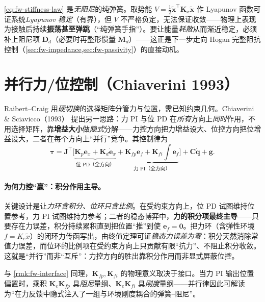 \begin{insight}
\label{ins:fw-stiffness-bounce}
\cref{eq:fw-stiffness-law} 是\emph{无阻尼}的纯弹簧。取势能 $V=\tfrac12\tilde{\mathbf{x}}^\top\mathbf{K}_x\tilde{\mathbf{x}}$ 作 Lyapunov 函数可证系统\emph{Lyapunov 稳定}（有界），但 $\dot V$ 不严格负定，无法保证收敛——物理上表现为接触后持续\textbf{振荡甚至弹跳}（“纯弹簧手指”）。要让能量\emph{耗散}从而渐近稳定，必须补上阻尼项 $\mathbf{D}_d$（必要时再整形惯量 $\mathbf{M}_d$）——这正是下一步走向 Hogan 完整阻抗控制（\cref{sec:fw-impedance,sec:fw-passivity}）的直接动机。
\end{insight}

\section{并行力/位控制（Chiaverini 1993）}
\label{sec:fw-parallel}

Raibert--Craig 用\emph{硬切换}的选择矩阵分管力与位置，需已知约束几何。Chiaverini \& Sciavicco（1993）\cite{chiaverini1993parallel} 提出另一思路：力 PI 与位 PD 在\emph{所有}方向上\emph{同时}作用，不用选择矩阵，靠\textbf{增益大小}做\emph{隐式}分解——力控方向把力增益设大、位控方向把位增益设大，二者在每个方向上“并行”竞争。其控制律为
\begin{equation}
  \boldsymbol{\tau}=\mathbf{J}^\top\!\Big[\underbrace{\mathbf{K}_p\mathbf{e}_x+\mathbf{K}_d\dot{\mathbf{e}}_x}_{\text{位 PD（全方向）}}+\underbrace{\mathbf{K}_{fp}\mathbf{e}_f+\mathbf{K}_{fi}\!\textstyle\int\mathbf{e}_f}_{\text{力 PI（全方向）}}\Big]+\mathbf{C}\dot{\mathbf{q}}+\mathbf{g}.
  \label{eq:fw-parallel-law}
\end{equation}

\paragraph{为何力控“赢”：积分作用主导。}
关键设计是让\emph{力环含积分、位环只含比例}。在受约束方向上，位 PD 试图维持位置参考，力 PI 试图维持力参考；二者的稳态博弈中，\textbf{力的积分项最终主导}——只要存在力误差，积分持续累积直到把位置“推”到使 $\mathbf{e}_f=\mathbf{0}$。把力环（含弹性环境 $f=K_e\tilde{x}$）的闭环力传函写出，由终值定理可证\emph{稳态力误差为零}：积分天然消除常值力误差，而位环的比例项在受约束方向上只贡献有限“抗力”、不阻止积分收敛。这就是“并行”而非“互斥”：力控方向的胜出靠积分作用而非显式屏蔽位控。

\begin{remark}[并行控制的接口量纲]
\label{rmk:fw-parallel-interface}
与 \cref{rmk:fw-interface} 同理，$\mathbf{K}_{fp},\mathbf{K}_{fi}$ 的物理意义取决于接口。当力 PI 输出位置偏置时，乘积 $\mathbf{K}_e\mathbf{K}_{fp}$ 具\emph{阻尼}量纲、$\mathbf{K}_e\mathbf{K}_{fi}$ 具\emph{刚度}量纲——并行律因此可解读为“在力反馈中隐式注入了一组与环境刚度耦合的弹簧--阻尼”。
\end{remark}

